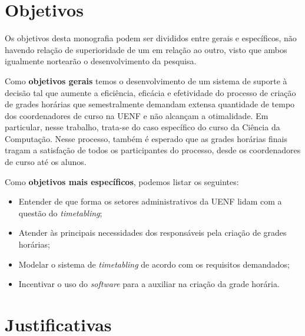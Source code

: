 \section{Objetivos} \label{sec:Objetivos}                %

Os objetivos desta monografia podem ser divididos entre gerais e específicos, não havendo relação de superioridade de um em relação ao outro, visto que ambos igualmente nortearão o desenvolvimento da pesquisa.


Como \textbf{objetivos gerais} temos o desenvolvimento de um sistema de suporte à decisão tal que aumente a eficiência, eficácia e efetividade do processo de criação de grades horárias que semestralmente demandam extensa quantidade de tempo dos coordenadores de curso na UENF e não alcançam a otimalidade. Em particular, nesse trabalho, trata-se do caso específico do curso da Ciência da Computação. Nesse processo, também é esperado que as grades horárias finais tragam a satisfação de todos os participantes do processo, desde os coordenadores de curso até os alunos.


Como \textbf{objetivos mais específicos}, podemos listar os seguintes:

\begin{itemize}
  \item Entender de que forma os setores administrativos da UENF lidam com a questão do \textit{timetabling};
  \item Atender às principais necessidades dos responsáveis pela criação de grades horárias;
  \item Modelar o sistema de \textit{timetabling} de acordo com os requisitos demandados;
  \item Incentivar o uso do \textit{software} para a auxiliar na criação da grade horária.
\end{itemize}

\section{Justificativas} \label{sec:Justificativas}      %

